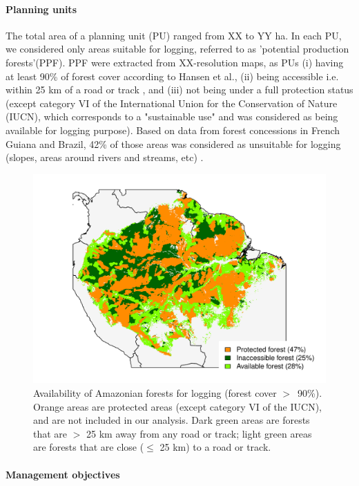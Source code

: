 \documentclass{article}
\begin{document}
\paragraph{Planning units}

The total area of a planning unit (PU) ranged from XX to YY ha. In each PU, we considered only areas suitable for logging, referred to as 'potential production forests'(PPF). PPF were extracted from XX-resolution maps, as PUs (i) having at least 90\% of forest cover according to Hansen et al.\cite{Hansen2013}, (ii) being accessible i.e. within 25 km of a road or track \cite{OSM2018,Asner2006}, and (iii) not being under a full protection status \cite{WDPA2016} (except category VI of the International Union for the Conservation of Nature (IUCN), which corresponds to a "sustainable use" and was considered as being available for logging purpose).
Based on data from forest concessions in French Guiana and Brazil, 42\% of those areas was considered as unsuitable for logging (slopes, areas around rivers and streams, etc) \cite{Piponiotc}. 

\begin{figure}
    \centering
    \includegraphics[width=0.8\linewidth]{graphs/harv_areas.pdf}
    \caption{Availability of Amazonian forests for logging (forest cover $>$~90\%). Orange areas are protected areas (except category VI of the IUCN), and are not included in our analysis. Dark green areas are forests that are $>$ 25 km away from any road or track; light green areas are forests that are close ($\leq$ 25 km) to a road or track.}
    \label{fig:pharv}
\end{figure}

\paragraph{Management objectives}
\end{document}
